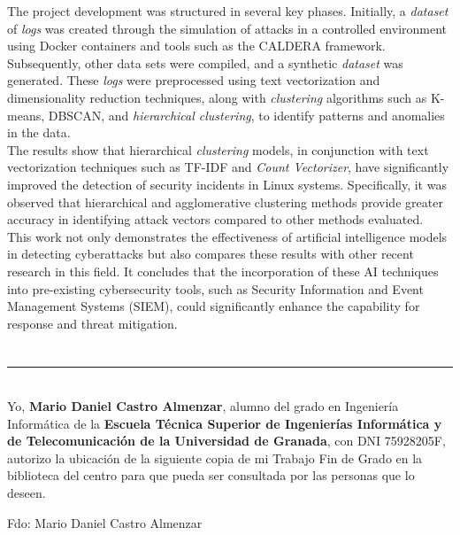 The project development was structured in several key phases. Initially, a \textit{dataset} of \textit{logs} was created through the simulation of attacks in a controlled environment using Docker containers and tools such as the \gls{CALDERA} framework. Subsequently, other data sets were compiled, and a synthetic \textit{dataset} was generated. These \textit{logs} were preprocessed using text vectorization and dimensionality reduction techniques, along with \textit{clustering} algorithms such as K-means, DBSCAN, and \textit{hierarchical clustering}, to identify patterns and anomalies in the data. \\

The results show that hierarchical \textit{clustering} models, in conjunction with text vectorization techniques such as \gls{TF}-\gls{IDF} and \textit{Count Vectorizer}, have significantly improved the detection of security incidents in Linux systems. Specifically, it was observed that hierarchical and agglomerative clustering methods provide greater accuracy in identifying attack vectors compared to other methods evaluated. \\

This work not only demonstrates the effectiveness of artificial intelligence models in detecting cyberattacks but also compares these results with other recent research in this field. It concludes that the incorporation of these AI techniques into pre-existing cybersecurity tools, such as Security Information and Event Management Systems (\gls{SIEM}), could significantly enhance the capability for response and threat mitigation.

\chapter*{}
\thispagestyle{empty}

\noindent\rule[-1ex]{\textwidth}{2pt}\\[4.5ex]

Yo, \textbf{Mario Daniel Castro Almenzar}, alumno del grado en Ingeniería Informática de la \textbf{Escuela Técnica Superior
de Ingenierías Informática y de Telecomunicación de la Universidad de Granada}, con DNI 75928205F, autorizo la
ubicación de la siguiente copia de mi Trabajo Fin de Grado en la biblioteca del centro para que pueda ser
consultada por las personas que lo deseen.

\vspace{6cm}

\noindent Fdo: Mario Daniel Castro Almenzar


